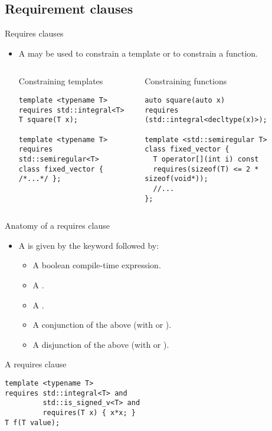 \subsection{Requirement clauses}

\begin{frame}[t,fragile]{Requires clauses}
\begin{itemize}
  \item A  may be used to constrain a template
        or to constrain a function.

\begin{columns}[T]

\pause
{}
\begin{block}{Constraining templates}
\begin{lstlisting}
template <typename T>
requires std::integral<T>
T square(T x);

template <typename T>
requires std::semiregular<T>
class fixed_vector { /*...*/ };
\end{lstlisting}
\end{block}

\pause
{}
\begin{block}{Constraining functions}
\begin{lstlisting}
auto square(auto x)
requires (std::integral<decltype(x)>);

template <std::semiregular T>
class fixed_vector {
  T operator[](int i) const 
  requires(sizeof(T) <= 2 * sizeof(void*));
  //...
};
\end{lstlisting}
\end{block}

\end{columns}
\end{itemize}
\end{frame}

\begin{frame}[t,fragile]{Anatomy of a requires clause}
\begin{itemize}
  \item A  is given by the 
        keyword followed by:
    \begin{itemize}
      \item A boolean compile-time expression.
      \item A .
      \item A .
      \item A conjunction of the above (with  or \cppkey{\&\&}).
      \item A disjunction of the above (with  or \cppkey{||}).
    \end{itemize}
\end{itemize}

\begin{block}{A requires clause}
\begin{lstlisting}
template <typename T>
requires std::integral<T> and
         std::is_signed_v<T> and
         requires(T x) { x*x; }
T f(T value);
\end{lstlisting}
\end{block}
\end{frame}
